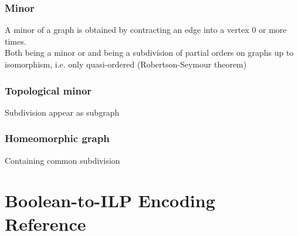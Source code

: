 \documentclass[10pt]{article}
\theoremstyle{definition}
\begin{document}
\subsubsection*{Minor}
A minor of a graph is obtained by contracting an edge into a vertex 0 or more times.\\
Both being a minor or and being a subdivision of partial orders on graphs up to isomorphism, i.e. only quasi-ordered (Robertson-Seymour theorem)
\subsubsection*{Topological minor}
Subdivision appear as subgraph
\subsubsection*{Homeomorphic graph}
Containing common subdivision



\clearpage

\section{Boolean-to-ILP Encoding Reference}\label{app:boolean}
\end{document}
